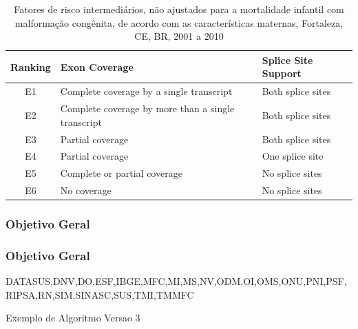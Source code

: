 	\lipsum[2]
	
	\begin{table}[h!]	
		\caption{Fatores de risco intermediários, não ajustados para a mortalidade infantil com malformação congênita, de acordo com as características maternas, Fortaleza, CE, BR, 2001 a 2010}
		\label{tab:internal-1}
		\centering
		\begin{tabular}{|c|l|l|}
			\hline
			Ranking & Exon Coverage & Splice Site Support\\
			\hline
			E1 & Complete coverage by a single transcript & Both splice sites\\
			E2 & Complete coverage by more than a single transcript & Both splice sites\\
			E3 & Partial coverage & Both splice sites\\
			E4 & Partial coverage & One splice site\\
			E5 & Complete or partial coverage & No splice sites\\
			E6 & No coverage & No splice sites\\
			\hline
		\end{tabular}
	\end{table}
\subsubsection{Objetivo Geral}
	\lipsum[2]
	
\subsubsection{Objetivo Geral}
	\lipsum[2]
	\acrlong{DATASUS},\acrlong{DNV},\acrlong{DO},\acrlong{ESF},\acrlong{IBGE},\acrlong{MFC},\acrlong{MI},\acrlong{MS},\acrlong{NV},\acrlong{ODM},\acrlong{OI},\acrlong{OMS},\acrlong{ONU},\acrlong{PNI},\acrlong{PSF},\acrlong{RIPSA},\acrlong{RN},\acrlong{SIM},\acrlong{SINASC},\acrlong{SUS},\acrlong{TMI},\acrlong{TMMFC}

\lipsum[2]
	\begin{algorithm}[H]
		\caption{Exemplo de Algoritmo Versao 3}
	\end{algorithm}
	